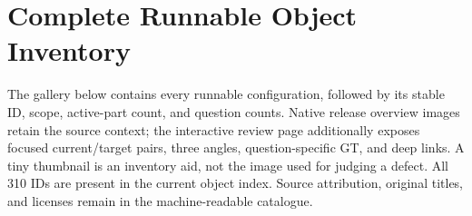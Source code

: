 \documentclass[10pt,twocolumn,letterpaper]{article}
\begin{document}
\section{Complete Runnable Object Inventory}
The gallery below contains every runnable configuration, followed by its stable ID, scope, active-part count, and question counts. Native release overview images retain the source context; the interactive review page additionally exposes focused current/target pairs, three angles, question-specific GT, and deep links. A tiny thumbnail is an inventory aid, not the image used for judging a defect. All 310 IDs are present in the current object index. Source attribution, original titles, and licenses remain in the machine-readable catalogue.

\clearpage

\end{document}

